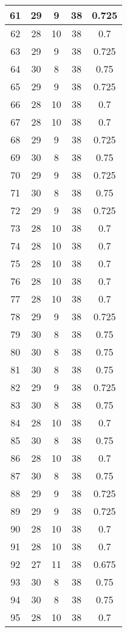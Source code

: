 \documentclass[letterpaper, 12pt]{article}
\begin{document}
\begin{longtable}{|c|c|c|c|c|}
\hline
61 & 29 & 9 & 38 & 0.725 \\
\hline
62 & 28 & 10 & 38 & 0.7 \\
\hline
63 & 29 & 9 & 38 & 0.725 \\
\hline
64 & 30 & 8 & 38 & 0.75 \\
\hline
65 & 29 & 9 & 38 & 0.725 \\
\hline
66 & 28 & 10 & 38 & 0.7 \\
\hline
67 & 28 & 10 & 38 & 0.7 \\
\hline
68 & 29 & 9 & 38 & 0.725 \\
\hline
69 & 30 & 8 & 38 & 0.75 \\
\hline
70 & 29 & 9 & 38 & 0.725 \\
\hline
71 & 30 & 8 & 38 & 0.75 \\
\hline
72 & 29 & 9 & 38 & 0.725 \\
\hline
73 & 28 & 10 & 38 & 0.7 \\
\hline
74 & 28 & 10 & 38 & 0.7 \\
\hline
75 & 28 & 10 & 38 & 0.7 \\
\hline
76 & 28 & 10 & 38 & 0.7 \\
\hline
77 & 28 & 10 & 38 & 0.7 \\
\hline
78 & 29 & 9 & 38 & 0.725 \\
\hline
79 & 30 & 8 & 38 & 0.75 \\
\hline
80 & 30 & 8 & 38 & 0.75 \\
\hline
81 & 30 & 8 & 38 & 0.75 \\
\hline
82 & 29 & 9 & 38 & 0.725 \\
\hline
83 & 30 & 8 & 38 & 0.75 \\
\hline
84 & 28 & 10 & 38 & 0.7 \\
\hline
85 & 30 & 8 & 38 & 0.75 \\
\hline
86 & 28 & 10 & 38 & 0.7 \\
\hline
87 & 30 & 8 & 38 & 0.75 \\
\hline
88 & 29 & 9 & 38 & 0.725 \\
\hline
89 & 29 & 9 & 38 & 0.725 \\
\hline
90 & 28 & 10 & 38 & 0.7 \\
\hline
91 & 28 & 10 & 38 & 0.7 \\
\hline
92 & 27 & 11 & 38 & 0.675 \\
\hline
93 & 30 & 8 & 38 & 0.75 \\
\hline
94 & 30 & 8 & 38 & 0.75 \\
\hline
95 & 28 & 10 & 38 & 0.7 \\

\end{longtable}
\end{document}
